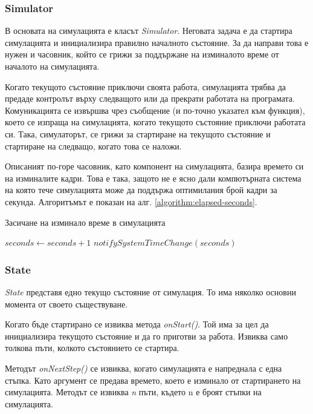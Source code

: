 		\subsubsection{Simulator}		
		
		В основата на симулацията е класът \emph{Simulator}. Неговата задача е да стартира симулацията
		и инициализира правилно началното състояние. За да направи това е нужен и часовник, който се грижи
		за поддържане на изминалото време от началото на симулацията. 
		
		Когато текущото състояние приключи своята работа, симулацията трябва да предаде контролът върху следващото или да прекрати работата
		на програмата. Комуникацията се извършва чрез съобщение (и по-точно указател към функция), което
		се изпраща на симулацията, когато текущото състояние приключи работата си. Така, симулаторът,
		се грижи за стартиране на текущото състояние и стартиране на следващо, когато това се наложи.
		
		Описаният по-горе часовник, като компонент на симулацията, базира времето си
		на изминалите кадри. Това е така, защото не е ясно дали компютърната система
		на която тече симулацията може да поддържа оптимилания брой кадри за секунда.
		Алгоритъмът е показан на алг. \ref{algorithm:elapsed-seconds}.

		\begin{algorithm}				
			\caption{Засичане на изминало време в симулацията}				
			\label{algorithm:elapsed-seconds}
			\begin{algorithmic}
					\State $seconds\gets seconds+1$
					\State $notifySystemTimeChange(seconds)$
				\EndIf
			\end{algorithmic}
		\end{algorithm}
		
		\subsubsection{State}					
		
		\emph{State} представя едно текущо състояние от симулация. То има няколко основни момента от своето съществуване.
		 
		Когато бъде стартирано се извиква метода \emph{onStart()}. Той има за цел да инициализира текущото състояние и да го приготви за работа.
		Извиква само толкова пъти, колкото състоянието се стартира. 
		
		Методът \emph{onNextStep()} се извиква, когато симулацията е напреднала 
		с една стъпка. Като аргумент се предава времето, което е изминало от стартирането на симулацията. 
		Методът се извиква \emph{n} пъти, където n е броят стъпки на симулацията. 
		
